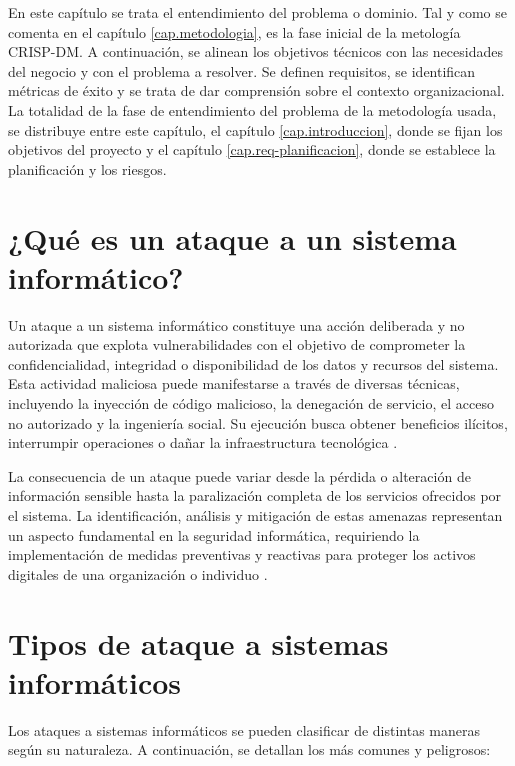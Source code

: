 En este capítulo se trata el entendimiento del problema o dominio. Tal y como se comenta en el capítulo \ref{cap.metodologia}, es la fase inicial de la metología CRISP-DM. A continuación, se alinean los objetivos técnicos con las necesidades del negocio y con el problema a resolver. Se definen requisitos, se identifican métricas de éxito y se trata de dar comprensión sobre el contexto organizacional. La totalidad de la fase de entendimiento del problema de la metodología usada, se distribuye entre este capítulo, el capítulo \ref{cap.introduccion}, donde se fijan los objetivos del proyecto y el capítulo \ref{cap.req-planificacion}, donde se establece la planificación y los riesgos.


\section{¿Qué es un ataque a un sistema informático?}
Un ataque a un sistema informático constituye una acción deliberada y no autorizada que explota vulnerabilidades con el objetivo de comprometer la confidencialidad, integridad o disponibilidad de los datos y recursos del sistema. Esta actividad maliciosa puede manifestarse a través de diversas técnicas, incluyendo la inyección de código malicioso, la denegación de servicio, el acceso no autorizado y la ingeniería social. Su ejecución busca obtener beneficios ilícitos, interrumpir operaciones o dañar la infraestructura tecnológica \cite{ethical_hacking}.

La consecuencia de un ataque puede variar desde la pérdida o alteración de información sensible hasta la paralización completa de los servicios ofrecidos por el sistema. La identificación, análisis y mitigación de estas amenazas representan un aspecto fundamental en la seguridad informática, requiriendo la implementación de medidas preventivas y reactivas para proteger los activos digitales de una organización o individuo \cite{conataques}.

\section{Tipos de ataque a sistemas informáticos}
Los ataques a sistemas informáticos se pueden clasificar de distintas maneras según su naturaleza. A continuación, se detallan los más comunes y peligrosos:

